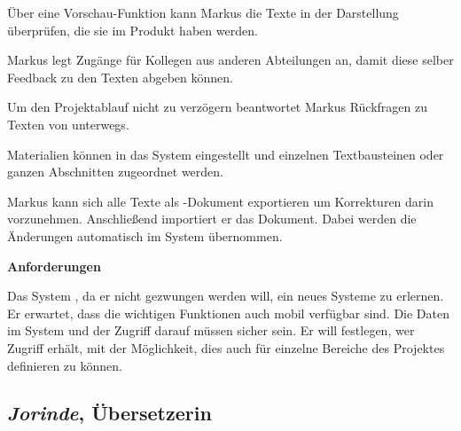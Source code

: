 \begin{multicols}{2}
Über eine Vorschau-Funktion kann Markus die Texte in der Darstellung überprüfen, die sie im Produkt haben werden.

Markus legt Zugänge für Kollegen aus anderen Abteilungen an, damit diese selber Feedback zu den Texten abgeben können.

Um den Projektablauf nicht zu verzögern beantwortet Markus Rückfragen zu Texten von unterwegs.

Materialien können in das System eingestellt und einzelnen Textbausteinen oder ganzen Abschnitten zugeordnet werden.

Markus kann sich alle Texte als -Dokument exportieren um Korrekturen darin vorzunehmen. Anschließend importiert er das Dokument. Dabei werden die Änderungen automatisch im System übernommen.

\textbf{Anforderungen}

Das System , da er nicht gezwungen werden will, ein neues Systeme zu erlernen. Er erwartet, dass die wichtigen Funktionen auch mobil verfügbar sind. Die Daten im System und der Zugriff darauf müssen sicher sein. Er will festlegen, wer Zugriff erhält, mit der Möglichkeit, dies auch für einzelne Bereiche des Projektes definieren zu können.

\end{multicols}

\pagebreak

\subsection{\emph{Jorinde}, Übersetzerin}\label{p:jorinde}

